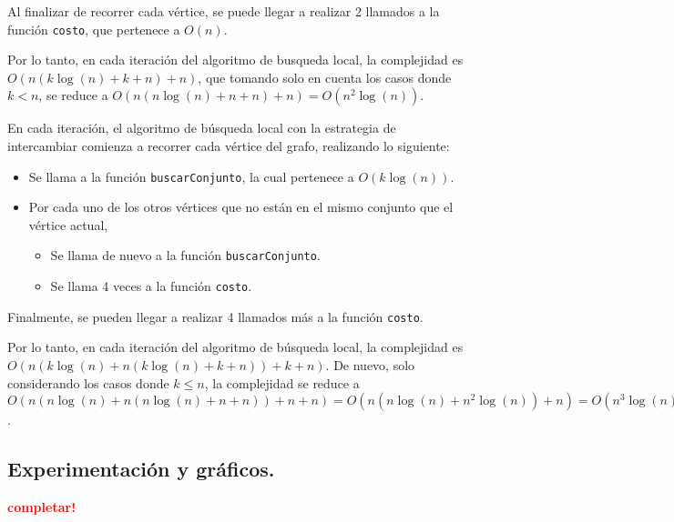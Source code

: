 Al finalizar de recorrer cada vértice, se puede llegar a realizar 2 llamados a
la función \texttt{costo}, que pertenece a $O(n)$.

Por lo tanto, en cada iteración del algoritmo de busqueda local, la complejidad
es $O(n (k\log(n) + k + n) + n)$, que tomando solo en cuenta los casos donde $k
< n$, se reduce a $O(n (n\log(n) + n + n) + n) = O(n^2 \log(n))$.

\vspace*{0.3cm}

En cada iteración, el algoritmo de búsqueda local con la estrategia de
intercambiar comienza a recorrer cada vértice del grafo, realizando lo
siguiente:
\begin{itemize}
  \item Se llama a la función \texttt{buscarConjunto}, la cual pertenece a
  $O(k\log(n))$.
  \item Por cada uno de los otros vértices que no están en el mismo conjunto
  que el vértice actual,
  \begin{itemize}
    \item Se llama de nuevo a la función \texttt{buscarConjunto}.
    \item Se llama 4 veces a la función \texttt{costo}.
  \end{itemize}
\end{itemize}

Finalmente, se pueden llegar a realizar 4 llamados más a la función
\texttt{costo}.

Por lo tanto, en cada iteración del algoritmo de búsqueda local, la complejidad
es $O(n (k\log(n) + n (k\log(n) + k + n)) + k + n)$. De nuevo, solo
considerando los casos donde $k \le n$, la complejidad se reduce a $O(n
(n\log(n) + n (n\log(n) + n + n)) + n + n) = O(n (n\log(n) + n^2 \log(n)) + n)
= O(n^3 \log(n))$.


\newpage \subsection{Experimentación y gráficos.}
\vspace*{0.3cm}

\textcolor{red}{\textbf{completar!}}
